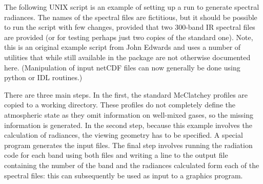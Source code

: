 The following UNIX script is an example of setting up a run to generate spectral
radiances. The names of the spectral files are fictitious, but it should be
possible to run the script with few changes, provided that two 300-band IR
spectral files are provided (or for testing perhaps just two copies of the
standard one). Note, this is an original example script from John Edwards
and uses a number of utilities that while still available in the package
are not otherwise documented here. (Manipulation of input netCDF files can
now generally be done using python or IDL routines.)

There are three main steps. In the first, the standard McClatchey profiles
are copied to a working directory. These profiles do not completely define
the atmospheric state as they omit information on well-mixed gases, so the
missing information is generated. In the second step, because this example
involves the calculation of radiances, the viewing geometry has to be 
specified. A special program generates the input files. The final step 
involves running the radiation code for each band using both files and
writing a line to the output file containing the number of the band and the
radiances calculated form each of the spectral files: this can subsequently
be used as input to a graphics program.

